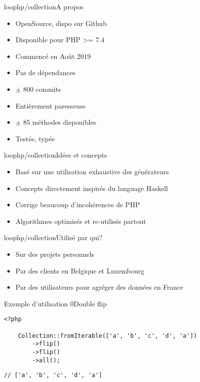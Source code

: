 \begin{frame}{loophp/collection}{A propos}
    \begin{itemize}[<+->]
        \item OpenSource, dispo sur Github
        \item Disponible pour PHP >= 7.4
        \item Commencé en Août 2019
        \item Pas de dépendances
        \item $\pm$ 800 commits
        \item Entièrement paresseuse
        \item $\pm$ 85 méthodes disponibles
        \item Testée, typée
    \end{itemize}
\end{frame}

\begin{frame}{loophp/collection}{Idées et concepts}
    \begin{itemize}[<+->]
        \item Basé sur une utilisation exhaustive des générateurs
        \item Concepts directement inspirés du language Haskell
        \item Corrige beaucoup d'incohérences de PHP
        \item Algorithmes optimisés et re-utilisés partout
    \end{itemize}
\end{frame}

\begin{frame}{loophp/collection}{Utilisé par qui?}
    \begin{itemize}[<+->]
        \item Sur des projets personnels
        \item Par des clients en Belgique et Luxembourg
        \item Par des utilisateurs pour agréger des données en France
    \end{itemize}
\end{frame}

\begin{frame}[fragile]{Exemple d'utilisation 0}{Double flip}
    \begin{lstlisting}[firstnumber=1]
    <?php

    Collection::fromIterable(['a', 'b', 'c', 'd', 'a'])
        ->flip()
        ->flip()
        ->all();
    \end{lstlisting}

    \pause

    \begin{lstlisting}[firstnumber=8]
    // ['a', 'b', 'c', 'd', 'a']
    \end{lstlisting}
\end{frame}

